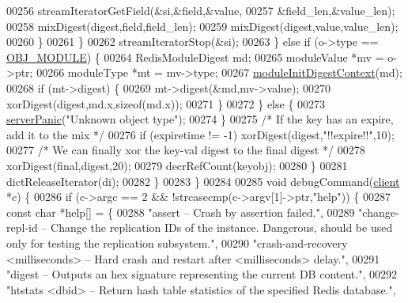 \begin{DoxyCode}
{{{00256                         streamIteratorGetField(&si,&field,&value,
00257                                                    &field\_len,&value\_len);
00258                         mixDigest(digest,field,field\_len);
00259                         mixDigest(digest,value,value\_len);
00260                     \}
00261                 \}
00262                 streamIteratorStop(&si);
00263             \} \textcolor{keywordflow}{else} \textcolor{keywordflow}{if} (o->type == \hyperlink{server_8h_a92c1fed85f709180fda0ff10d37d649b}{OBJ\_MODULE}) \{
00264                 RedisModuleDigest md;
00265                 moduleValue *mv = o->ptr;
00266                 moduleType *mt = mv->type;
00267                 \hyperlink{server_8h_ad35ec85f132a5decb20a3c5b73722ef5}{moduleInitDigestContext}(md);
00268                 \textcolor{keywordflow}{if} (mt->digest) \{
00269                     mt->digest(&md,mv->value);
00270                     xorDigest(digest,md.x,\textcolor{keyword}{sizeof}(md.x));
00271                 \}
00272             \} \textcolor{keywordflow}{else} \{
00273                 \hyperlink{server_8h_a11cc378e7778a830b41240578de3b204}{serverPanic}(\textcolor{stringliteral}{"Unknown object type"});
00274             \}
00275             \textcolor{comment}{/* If the key has an expire, add it to the mix */}
00276             \textcolor{keywordflow}{if} (expiretime != -1) xorDigest(digest,\textcolor{stringliteral}{"!!expire!!"},10);
00277             \textcolor{comment}{/* We can finally xor the key-val digest to the final digest */}
00278             xorDigest(final,digest,20);
00279             decrRefCount(keyobj);
00280         \}
00281         dictReleaseIterator(di);
00282     \}
00283 \}
00284 
00285 \textcolor{keywordtype}{void} debugCommand(\hyperlink{structclient}{client} *c) \{
00286     \textcolor{keywordflow}{if} (c->argc == 2 && !strcasecmp(c->argv[1]->ptr,\textcolor{stringliteral}{"help"})) \{
00287         \textcolor{keyword}{const} \textcolor{keywordtype}{char} *help[] = \{
00288 \textcolor{stringliteral}{"assert -- Crash by assertion failed."},
00289 \textcolor{stringliteral}{"change-repl-id -- Change the replication IDs of the instance. Dangerous, should be used only for
       testing the replication subsystem."},
00290 \textcolor{stringliteral}{"crash-and-recovery <milliseconds> -- Hard crash and restart after <milliseconds> delay."},
00291 \textcolor{stringliteral}{"digest -- Outputs an hex signature representing the current DB content."},
00292 \textcolor{stringliteral}{"htstats <dbid> -- Return hash table statistics of the specified Redis database."},
}}}
\end{DoxyCode}
